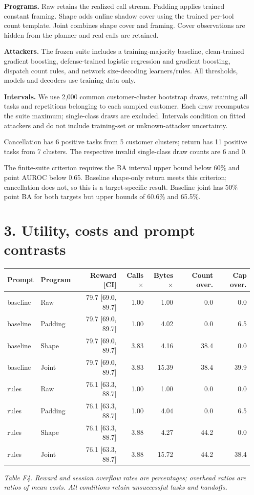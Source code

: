 \documentclass[10pt,letterpaper]{article}
\begin{document}
\textbf{Programs.} Raw retains the realized call stream. Padding applies trained constant framing. Shape adds online shadow cover using the trained per-tool count template. Joint combines shape cover and framing. Cover observations are hidden from the planner and real calls are retained.

\textbf{Attackers.} The frozen suite includes a training-majority baseline, clean-trained gradient boosting, defense-trained logistic regression and gradient boosting, dispatch count rules, and network size-decoding learners/rules. All thresholds, models and decoders use training data only.

\textbf{Intervals.} We use 2,000 common customer-cluster bootstrap draws, retaining all tasks and repetitions belonging to each sampled customer. Each draw recomputes the suite maximum; single-class draws are excluded. Intervals condition on fitted attackers and do not include training-set or unknown-attacker uncertainty.

Cancellation has 6 positive tasks from 5 customer clusters; return has 11 positive tasks from 7 clusters. The respective invalid single-class draw counts are 6 and 0.

The finite-suite criterion requires the BA interval upper bound below 60\% and point AUROC below 0.65. Baseline shape-only return meets this criterion; cancellation does not, so this is a target-specific result. Baseline joint has 50\% point BA for both targets but upper bounds of 60.6\% and 65.5\%.

\clearpage\section*{3. Utility, costs and prompt contrasts}

\begin{center}\small
\begin{tabular}{@{}llrrrrr@{}}\toprule
Prompt & Program & Reward [CI] & Calls$\times$ & Bytes$\times$ & Count over. & Cap over.\\\midrule
baseline & Raw & 79.7 [69.0, 89.7] & 1.00 & 1.00 & 0.0 & 0.0\\
baseline & Padding & 79.7 [69.0, 89.7] & 1.00 & 4.02 & 0.0 & 6.5\\
baseline & Shape & 79.7 [69.0, 89.7] & 3.83 & 4.16 & 38.4 & 0.0\\
baseline & Joint & 79.7 [69.0, 89.7] & 3.83 & 15.39 & 38.4 & 39.9\\
rules & Raw & 76.1 [63.3, 88.7] & 1.00 & 1.00 & 0.0 & 0.0\\
rules & Padding & 76.1 [63.3, 88.7] & 1.00 & 4.04 & 0.0 & 6.5\\
rules & Shape & 76.1 [63.3, 88.7] & 3.88 & 4.27 & 44.2 & 0.0\\
rules & Joint & 76.1 [63.3, 88.7] & 3.88 & 15.72 & 44.2 & 38.4\\
\bottomrule\end{tabular}
\end{center}
\noindent\textit{Table F4. Reward and session overflow rates are percentages; overhead ratios are ratios of mean costs. All conditions retain unsuccessful tasks and handoffs.}
\par\medskip
\end{document}
